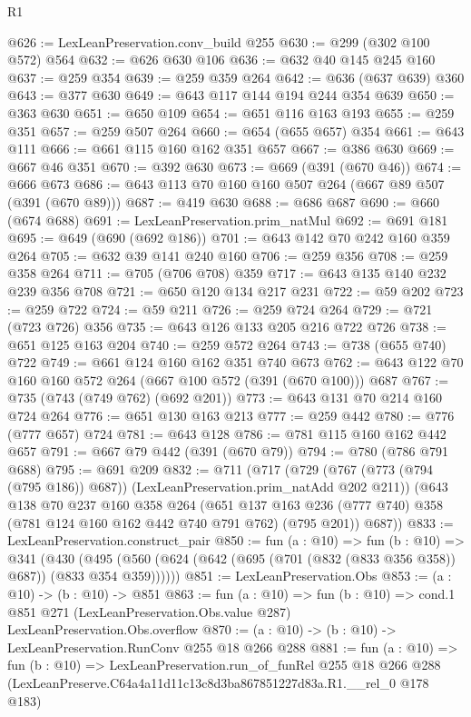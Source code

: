\begin{lexlean}{R1}
\begin{coremodule}
@626 := LexLeanPreservation.conv_build @255
@630 := @299 (@302 @100 @572) @564
@632 := @626 @630 @106
@636 := @632 @40 @145 @245 @160
@637 := @259 @354
@639 := @259 @359 @264
@642 := @636 (@637 @639) @360
@643 := @377 @630
@649 := @643 @117 @144 @194 @244 @354 @639
@650 := @363 @630
@651 := @650 @109
@654 := @651 @116 @163 @193
@655 := @259 @351
@657 := @259 @507 @264
@660 := @654 (@655 @657) @354
@661 := @643 @111
@666 := @661 @115 @160 @162 @351 @657
@667 := @386 @630
@669 := @667 @46 @351
@670 := @392 @630
@673 := @669 (@391 (@670 @46))
@674 := @666 @673
@686 := @643 @113 @70 @160 @160 @507 @264 (@667 @89 @507 (@391 (@670 @89)))
@687 := @419 @630
@688 := @686 @687
@690 := @660 (@674 @688)
@691 := LexLeanPreservation.prim_natMul
@692 := @691 @181
@695 := @649 (@690 (@692 @186))
@701 := @643 @142 @70 @242 @160 @359 @264
@705 := @632 @39 @141 @240 @160
@706 := @259 @356
@708 := @259 @358 @264
@711 := @705 (@706 @708) @359
@717 := @643 @135 @140 @232 @239 @356 @708
@721 := @650 @120 @134 @217 @231
@722 := @59 @202
@723 := @259 @722
@724 := @59 @211
@726 := @259 @724 @264
@729 := @721 (@723 @726) @356
@735 := @643 @126 @133 @205 @216 @722 @726
@738 := @651 @125 @163 @204
@740 := @259 @572 @264
@743 := @738 (@655 @740) @722
@749 := @661 @124 @160 @162 @351 @740 @673
@762 := @643 @122 @70 @160 @160 @572 @264 (@667 @100 @572 (@391 (@670 @100))) @687
@767 := @735 (@743 (@749 @762) (@692 @201))
@773 := @643 @131 @70 @214 @160 @724 @264
@776 := @651 @130 @163 @213
@777 := @259 @442
@780 := @776 (@777 @657) @724
@781 := @643 @128
@786 := @781 @115 @160 @162 @442 @657
@791 := @667 @79 @442 (@391 (@670 @79))
@794 := @780 (@786 @791 @688)
@795 := @691 @209
@832 := @711
    (@717
      (@729 (@767 (@773 (@794 (@795 @186)) @687)) (LexLeanPreservation.prim_natAdd @202 @211))
      (@643
        @138
        @70
        @237
        @160
        @358
        @264
        (@651 @137 @163 @236 (@777 @740) @358 (@781 @124 @160 @162 @442 @740 @791 @762) (@795 @201))
        @687))
@833 := LexLeanPreservation.construct_pair
@850 := fun (a : @10) =>
  fun (b : @10) =>
  @341
    (@430 (@495 (@560 (@624 (@642 (@695 (@701 (@832 (@833 @356 @358)) @687)) (@833 @354 @359))))))
@851 := LexLeanPreservation.Obs
@853 := (a : @10) -> (b : @10) -> @851
@863 := fun (a : @10) =>
  fun (b : @10) =>
  cond.{1} @851 @271 (LexLeanPreservation.Obs.value @287) LexLeanPreservation.Obs.overflow
@870 := (a : @10) -> (b : @10) -> LexLeanPreservation.RunConv @255 @18 @266 @288
@881 := fun (a : @10) =>
  fun (b : @10) =>
  LexLeanPreservation.run_of_funRel
    @255
    @18
    @266
    @288
    (LexLeanPreserve.C64a4a11d11c13c8d3ba867851227d83a.R1.__rel_0 @178 @183)
\end{coremodule}
\end{lexlean}
